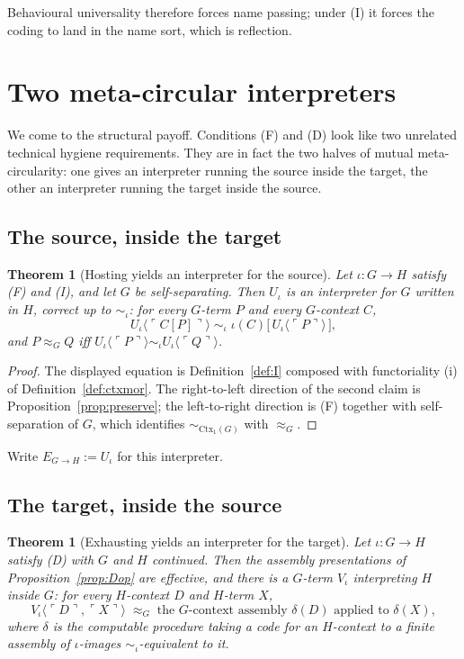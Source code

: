 \documentclass[11pt,a4paper]{article}
\theoremstyle{definition}
\theoremstyle{plain}
\newtheorem{theorem}[definition]{Theorem}
\theoremstyle{remark}
\newcommand{\Ctx}{\mathrm{Ctx}}
\newcommand{\code}[1]{\ulcorner #1 \urcorner}
\newcommand{\bisim}{\approx}
\begin{document}
Behavioural universality therefore forces name passing; under (I) it forces the
coding to land in the name sort, which is reflection.

\section{Two meta-circular interpreters}
\label{sec:meta}

We come to the structural payoff. Conditions (F) and (D) look like two unrelated
technical hygiene requirements. They are in fact the two halves of mutual
meta-circularity: one gives an interpreter running the source inside the target, the
other an interpreter running the target inside the source.

\subsection{The source, inside the target}

\begin{theorem}[Hosting yields an interpreter for the source]
\label{thm:src-in-tgt}
Let $\iota : G \to H$ satisfy (F) and (I), and let $G$ be self-separating. Then
$U_\iota$ is an interpreter for $G$ written in $H$, correct up to $\sim_\iota$: for
every $G$-term $P$ and every $G$-context $C$,
\[
U_\iota\langle \code{C[P]}\rangle \;\sim_\iota\; \iota(C)\bigl[\,U_\iota\langle\code{P}\rangle\,\bigr],
\]
and $P \bisim_G Q$ iff
$U_\iota\langle\code{P}\rangle \sim_\iota U_\iota\langle\code{Q}\rangle$.
\end{theorem}

\begin{proof}
The displayed equation is Definition~\ref{def:I} composed with functoriality (i) of
Definition~\ref{def:ctxmor}. The right-to-left direction of the second claim is
Proposition~\ref{prop:preserve}; the left-to-right direction is (F) together with
self-separation of $G$, which identifies $\sim_{\Ctx_1(G)}$ with $\bisim_G$.
\end{proof}

Write $E_{G\to H} := U_\iota$ for this interpreter.

\subsection{The target, inside the source}

\begin{theorem}[Exhausting yields an interpreter for the target]
\label{thm:tgt-in-src}
Let $\iota : G \to H$ satisfy (D) with $G$ and $H$ continued. Then the assembly
presentations of Proposition~\ref{prop:Dop} are effective, and there is a $G$-term
$V_\iota$ interpreting $H$ inside $G$: for every $H$-context $D$ and $H$-term $X$,
\[
V_\iota\langle \code{D},\code{X}\rangle \;\bisim_G\; \text{the }G\text{-context assembly } \delta(D) \text{ applied to } \delta(X),
\]
where $\delta$ is the computable procedure taking a code for an $H$-context to a
finite assembly of $\iota$-images $\sim_\iota$-equivalent to it.
\end{theorem}
\end{document}

